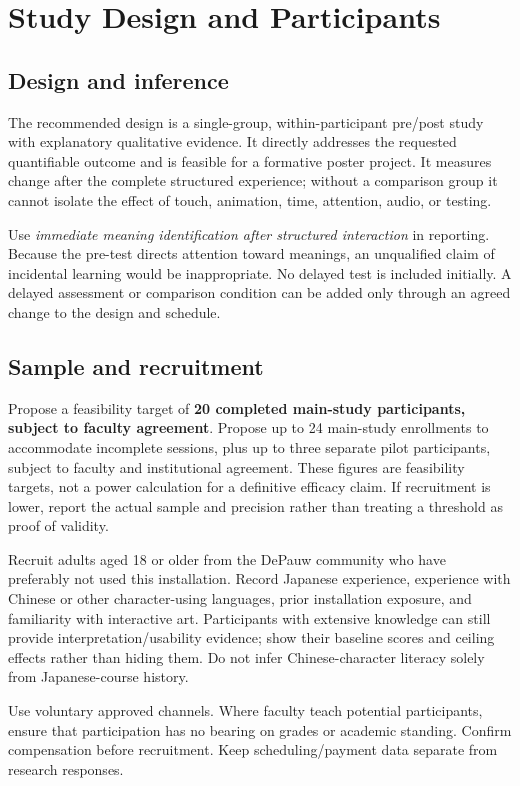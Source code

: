 \documentclass[11pt,letterpaper]{article}
\begin{document}
\section{Study Design and Participants}
\subsection{Design and inference}
The recommended design is a single-group, within-participant pre/post study with explanatory qualitative evidence. It directly addresses the requested quantifiable outcome and is feasible for a formative poster project. It measures change after the complete structured experience; without a comparison group it cannot isolate the effect of touch, animation, time, attention, audio, or testing.

Use \emph{immediate meaning identification after structured interaction} in reporting. Because the pre-test directs attention toward meanings, an unqualified claim of incidental learning would be inappropriate. No delayed test is included initially. A delayed assessment or comparison condition can be added only through an agreed change to the design and schedule.

\subsection{Sample and recruitment}
Propose a feasibility target of \textbf{20 completed main-study participants, subject to faculty agreement}. Propose up to 24 main-study enrollments to accommodate incomplete sessions, plus up to three separate pilot participants, subject to faculty and institutional agreement. These figures are feasibility targets, not a power calculation for a definitive efficacy claim. If recruitment is lower, report the actual sample and precision rather than treating a threshold as proof of validity.

Recruit adults aged 18 or older from the DePauw community who have preferably not used this installation. Record Japanese experience, experience with Chinese or other character-using languages, prior installation exposure, and familiarity with interactive art. Participants with extensive knowledge can still provide interpretation/usability evidence; show their baseline scores and ceiling effects rather than hiding them. Do not infer Chinese-character literacy solely from Japanese-course history.

Use voluntary approved channels. Where faculty teach potential participants, ensure that participation has no bearing on grades or academic standing. Confirm compensation before recruitment. Keep scheduling/payment data separate from research responses.
\end{document}
